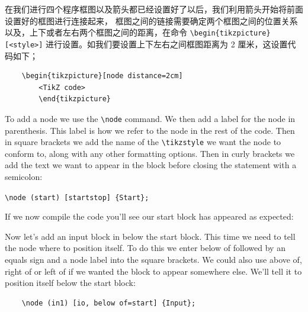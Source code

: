 \documentclass[cn,11pt, simple]{elegantbook}
\begin{document}
在我们进行四个程序框图以及箭头都已经设置好了以后，我们利用箭头开始将前面设置好的框图进行连接起来，
框图之间的链接需要确定两个框图之间的位置关系以及，上下或者左右两个框图之间的距离，在命令 \verb|\begin{tikzpicture}[<style>]| 进行设置。如我们要设置上下左右之间框图距离为 2 厘米，这设置代码如下；

\begin{verbatim}
	\begin{tikzpicture}[node distance=2cm]
		<TikZ code>
		\end{tikzpicture}
\end{verbatim}

To add a node we use the \verb|\node| command. We then add a label for the node in parenthesis. This label is how we refer to the node in the rest of the code. Then in square brackets we add the name of the \verb|\tikzstyle| we want the node to conform to, along with any other formatting options. Then in curly brackets we add the text we want to appear in the block before closing the statement with a semicolon:

\verb|\node (start) [startstop] {Start};|

If we now compile the code you'll see our start block has appeared as expected:


Now let's add an input block in below the start block. This time we need to tell the node where to position itself. To do this we enter below of followed by an equals sign and a node label into the square brackets. We could also use above of, right of or left of if we wanted the block to appear somewhere else. We'll tell it to position itself below the start block:
\begin{verbatim}
	\node (in1) [io, below of=start] {Input};
\end{verbatim}
\end{document}
